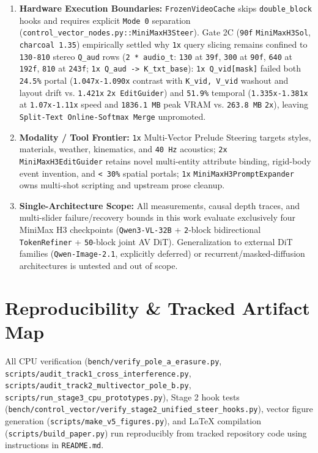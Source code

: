 \documentclass[10pt]{article}
\begin{document}
\begin{enumerate}[leftmargin=*]
\item \textbf{Hardware Execution Boundaries:} \texttt{FrozenVideoCache} skips \texttt{double\_block} hooks and requires explicit \texttt{Mode 0} separation (\texttt{control\_vector\_nodes.py::MiniMaxH3Steer}). Gate 2C (\texttt{90f} \texttt{MiniMaxH3Sol}, \texttt{charcoal 1.35}) empirically settled why \texttt{1x} query slicing remains confined to \texttt{130-810} stereo \texttt{Q\_aud} rows (\texttt{2 * audio\_t}: \texttt{130} at \texttt{39f}, \texttt{300} at \texttt{90f}, \texttt{640} at \texttt{192f}, \texttt{810} at \texttt{243f}; \texttt{1x Q\_aud -> K\_txt\_base}): \texttt{1x Q\_vid[mask]} failed both \texttt{24.5\%} portal (\texttt{1.047x-1.090x} contrast with \texttt{K\_vid, V\_vid} washout and layout drift vs. \texttt{1.421x} \texttt{2x EditGuider}) and \texttt{51.9\%} temporal (\texttt{1.335x-1.381x} at \texttt{1.07x-1.11x} speed and \texttt{1836.1 MB} peak VRAM vs. \texttt{263.8 MB} \texttt{2x}), leaving \texttt{Split-Text Online-Softmax Merge} unpromoted.
\item \textbf{Modality / Tool Frontier:} \texttt{1x} Multi-Vector Prelude Steering targets styles, materials, weather, kinematics, and \texttt{40 Hz} acoustics; \texttt{2x} \texttt{MiniMaxH3EditGuider} retains novel multi-entity attribute binding, rigid-body event invention, and \texttt{< 30\%} spatial portals; \texttt{1x} \texttt{MiniMaxH3PromptExpander} owns multi-shot scripting and upstream prose cleanup.
\item \textbf{Single-Architecture Scope:} All measurements, causal depth traces, and multi-slider failure/recovery bounds in this work evaluate exclusively four MiniMax H3 checkpoints (\texttt{Qwen3-VL-32B} + \texttt{2}-block bidirectional \texttt{TokenRefiner} + \texttt{50}-block joint AV DiT). Generalization to external DiT families (\texttt{Qwen-Image-2.1}, explicitly deferred) or recurrent/masked-diffusion architectures is untested and out of scope.
\end{enumerate}


\section{Reproducibility \& Tracked Artifact Map}

All CPU verification (\texttt{bench/verify\_pole\_a\_erasure.py}, \texttt{scripts/audit\_track1\_cross\_interference.py}, \texttt{scripts/audit\_track2\_multivector\_pole\_b.py}, \texttt{scripts/run\_stage3\_cpu\_prototypes.py}), Stage 2 hook tests (\texttt{bench/control\_vector/verify\_stage2\_unified\_steer\_hooks.py}), vector figure generation (\texttt{scripts/make\_v5\_figures.py}), and LaTeX compilation (\texttt{scripts/build\_paper.py}) run reproducibly from tracked repository code using instructions in \texttt{README.md}.
\end{document}
